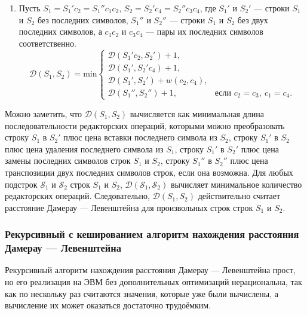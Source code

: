 \begin{enumerate}
    \item Пусть $S_1 = S_1'c_2 = S_1''c_1c_2$, $S_2 = S_2'c_4 = S_2''c_3c_4$, где $S_1'$ и $S_2'$ --- строки $S_1$ и $S_2$ без последних символов, $S_1''$ и $S_2''$ --- строки $S_1$ и $S_2$ без двух последних символов, а $c_1c_2$ и $c_3c_4$ --- пары их последних символов соответственно. $$
    \mathcal{D}(S_1, S_2) = \mathrm{min} \begin{cases}
        \mathcal{D}(S_1'c_2, S_2') + 1, \\
        \mathcal{D}(S_1', S_2'c_4) + 1, \\
        \mathcal{D}(S_1', S_2') + w(c_2, c_4), \\
        \mathcal{D}(S_1'', S_2'') + 1,\ &\text{если $c_2 = c_3,\ c_1 = c_4$}.
    \end{cases}
        $$
\end{enumerate}

Можно заметить, что $\mathcal{D}(S_1, S_2)$ вычисляется как минимальная длина последовательности редакторских операций, которыми можно преобразовать строку $S_1$ в $S_2'$ плюс цена вставки последнего символа из $S_2$, строку $S_1'$ в $S_2$ плюс цена удаления последнего символа из $S_1$, строку $S_1'$ в $S_2'$ плюс цена замены последних символов строк $S_1$ и $S_2$, строку $S_1''$ в $S_2''$ плюс цена транспозиции двух последних символов строк, если она возможна.
Для любых подстрок $\mathcal{S}_1$ и $\mathcal{S}_2$ строк $S_1$ и $S_2$, $\mathcal{D}(\mathcal{S}_1, \mathcal{S}_2)$ вычисляет минимальное количество редакторских операций.
Следовательно, $\mathcal{D}(S_1, S_2)$ действительно считает расстояние Дамерау --- Левенштейна для произвольных строк строк $S_1$ и $S_2$.

\subsubsection{Рекурсивный с кешированием алгоритм нахождения расстояния Дамерау --- Левенштейна}

Рекурсивный алгоритм нахождения расстояния Дамерау --- Левенштейна прост, но его реализация на ЭВМ без дополнительных оптимизаций нерациональна, так как по нескольку раз считаются значения, которые уже были вычислены, а вычисление их может оказаться достаточно трудоёмким.

